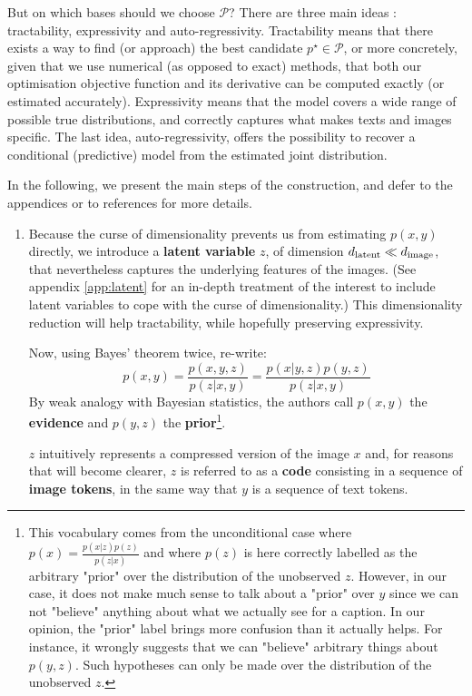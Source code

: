 \documentclass{article}
\begin{document}
\begin{multicols}{2}
But on which bases should we choose $\mathcal{P}$? There are three main ideas : tractability, expressivity and auto-regressivity. Tractability means that there exists a way to find (or approach) the best candidate $p^\star \in \mathcal{P}$, or more concretely, given that we use numerical (as opposed to exact) methods, that both our optimisation objective function and its derivative can be computed exactly (or estimated accurately). Expressivity means that the model covers a wide range of possible true distributions, and correctly captures what makes texts and images specific. The last idea, auto-regressivity, offers the possibility to recover a conditional (predictive) model from the estimated joint distribution.

In the following, we present the main steps of the construction, and defer to the appendices or to references for more details.

\begin{enumerate}

    \item Because the curse of dimensionality prevents us from estimating $p(x,y)$ directly, we introduce a \textbf{latent variable} $z$, of dimension ${d_{\mathrm{latent}}} \ll d_{\mathrm{image}}$, that nevertheless captures the underlying features of the images.
    (See appendix \ref{app:latent} for an in-depth treatment of the interest to include latent variables to cope with the curse of dimensionality.)
    This dimensionality reduction will help tractability, while hopefully preserving expressivity.
    
    Now, using Bayes' theorem twice, re-write: $$p(x,y)=\frac{p(x,y,z)}{p(z|x,y)}=\frac{p(x|y,z)p(y,z)}{p(z|x,y)}$$
    By weak analogy with Bayesian statistics, the authors call $p(x,y)$ the \textbf{evidence} and $p(y,z)$ the \textbf{prior}\footnote{
    This vocabulary comes from the unconditional case where $p(x)=\frac{p(x|z)p(z)}{p(z|x)}$ and where $p(z)$ is here correctly labelled as the arbitrary "prior" over the distribution of the unobserved $z$.
    However, in our case, it does not make much sense to talk about a "prior" over $y$ since we can not "believe" anything about what we actually see for a caption. In our opinion, the "prior" label brings more confusion than it actually helps. For instance, it wrongly suggests that we can "believe" arbitrary things about $p(y,z)$. Such hypotheses can only be made over the distribution of the unobserved $z$.
    }.
    
    $z$ intuitively represents a compressed version of the image $x$ and, for reasons that will become clearer, $z$ is referred to as a \textbf{code} consisting in a sequence of \textbf{image tokens}, in the same way that $y$ is a sequence of text tokens.
    

\end{enumerate}
\end{multicols}
\end{document}
